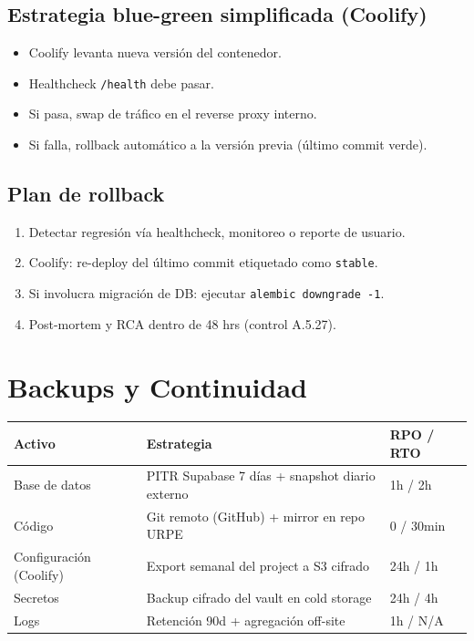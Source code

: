 \documentclass[12pt,a4paper,oneside]{article}
\begin{document}
\subsection{Estrategia blue-green simplificada (Coolify)}

\begin{itemize}[leftmargin=*]
  \item Coolify levanta nueva versión del contenedor.
  \item Healthcheck \texttt{/health} debe pasar.
  \item Si pasa, swap de tráfico en el reverse proxy interno.
  \item Si falla, rollback automático a la versión previa (último commit verde).
\end{itemize}

\subsection{Plan de rollback}

\begin{enumerate}[leftmargin=*]
  \item Detectar regresión vía healthcheck, monitoreo o reporte de usuario.
  \item Coolify: re-deploy del último commit etiquetado como \texttt{stable}.
  \item Si involucra migración de DB: ejecutar \texttt{alembic downgrade -1}.
  \item Post-mortem y RCA dentro de 48 hrs (control A.5.27).
\end{enumerate}

\section{Backups y Continuidad}

\begin{table}[h]
\centering
\small
\begin{tabularx}{\textwidth}{lXl}
\toprule
\textbf{Activo} & \textbf{Estrategia} & \textbf{RPO / RTO} \\
\midrule
Base de datos & PITR Supabase 7 días + snapshot diario externo & 1h / 2h \\
Código & Git remoto (GitHub) + mirror en repo URPE & 0 / 30min \\
Configuración (Coolify) & Export semanal del project a S3 cifrado & 24h / 1h \\
Secretos & Backup cifrado del vault en cold storage & 24h / 4h \\
Logs & Retención 90d + agregación off-site & 1h / N/A \\
\bottomrule
\end{tabularx}
\end{table}
\end{document}
